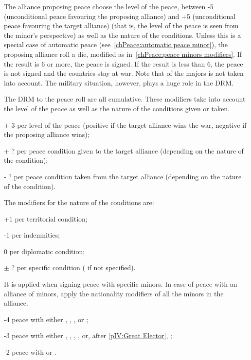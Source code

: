 \aparag[Method]
\bparag The alliance proposing peace choose the level of the peace, between -5
(unconditional peace favouring the proposing alliance) and +5 (unconditional
peace favouring the target alliance) (that is, the level of the peace is seen
from the minor's perspective) as well as the nature of the conditions.
\bparag Unless this is a special case of automatic peace
(see~\ref{chPeace:automatic peace minor}), the proposing alliance roll a die,
modified as in~\ref{chPeace:peace minors modifiers}.
\bparag If the result is 6 or more, the peace is signed.
\bparag If the result is less than 6, the peace is not signed and the
countries stay at war.
\bparag Note that \STAB of the majors is not taken into account. The military
situation, however, plays a huge role in the DRM.


\label{chPeace:peace minors modifiers}
The DRM to the peace roll are all cumulative.
 These modifiers take into account the level of
the peace as well as the nature of the conditions given or taken.
\begin{modlist}
\item[$\pm$ 3] per level of the peace (positive if the target alliance wins
  the war, negative if the proposing alliance wins);
\item[+ ?] per peace condition given to the target alliance (depending on the
  nature of the condition);
\item[- ?] per peace condition taken from the target alliance (depending on
  the nature of the condition).
\end{modlist}
\bparag The modifiers for the nature of the conditions are:
\begin{modlist}
\item[+1] per territorial condition;
\item[-1] per indemnities;
\item[0] per diplomatic condition;
\item[$\pm$ ?] per specific condition ( if not specified).
\end{modlist}
It is applied when signing peace with specific minors. In case of peace with
an alliance of minors, apply the nationality modifiers of all the minors in
the alliance.
\begin{modlist}
\item[-4] peace with either \paysPerse, \paysEgypte, \paysDamas, \paysChine or
  \paysJapon;
\item[-3] peace with either \paysUSA, \paysMogol, \paysVenise, \paysPologne,
  \paysHabsbourg or, after \ref{pIV:Great Elector}, \paysBrandebourg;
\item[-2] peace with \paysPortugal or \paysDanemark.
\end{modlist}
